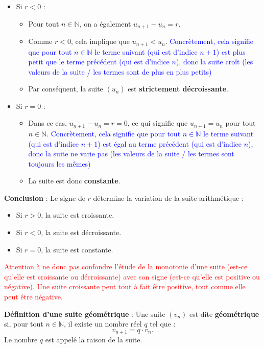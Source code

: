\documentclass{exam}
\begin{document}
\begin{questions}
\begin{itemize}
    \item Si \( r < 0 \) :
    \begin{itemize}
        \item Pour tout \( n \in \mathbb{N} \), on a également \( u_{n+1} - u_n = r \).
        \item Comme \( r < 0 \), cela implique que \( u_{n+1} < u_n \). \textcolor{blue}{Concrètement, cela signifie que pour tout \( n \in \mathbb{N} \) le terme suivant (qui est d'indice $n+1$) est plus petit que le terme précédent (qui est d'indice $n$), donc la suite croît (les valeurs de la suite / les termes sont de plus en plus petits)}
        \item Par conséquent, la suite \((u_n)\) est \textbf{strictement décroissante}.
    \end{itemize}

    \item Si \( r = 0 \) :
    \begin{itemize}
        \item Dans ce cas, \( u_{n+1} - u_n = r = 0 \), ce qui signifie que \( u_{n+1} = u_n \) pour tout \( n \in \mathbb{N} \). \textcolor{blue}{Concrètement, cela signifie que pour tout \( n \in \mathbb{N} \) le terme suivant (qui est d'indice $n+1$) est égal au terme précédent (qui est d'indice $n$), donc la suite ne varie pas (les valeurs de la suite / les termes sont toujours les mêmes)}
        \item La suite est donc \textbf{constante}.
    \end{itemize}
\end{itemize}

\textbf{Conclusion} : Le signe de \( r \) détermine la variation de la suite arithmétique :
\begin{itemize}
    \item Si \( r > 0 \), la suite est croissante.
    \item Si \( r < 0 \), la suite est décroissante.
    \item Si \( r = 0 \), la suite est constante.

\end{itemize}

\textcolor{red}{Attention à ne donc pas confondre l'étude de la monotonie d'une suite (est-ce qu'elle est croissante ou décroissante) avec son signe (est-ce qu'elle est positive ou négative). Une suite croissante peut tout à fait être positive, tout comme elle peut être négative.}

  \question[0.5] \textbf{Définition d'une suite géométrique} :
  Une suite $(v_n)$ est dite \textbf{géométrique} si, pour tout $n \in \mathbb{N}$, il existe un nombre réel $q$ tel que :
  \[
  v_{n+1} = q \cdot v_n.
  \]
  Le nombre $q$ est appelé la raison de la suite.



\end{questions}
\end{document}
